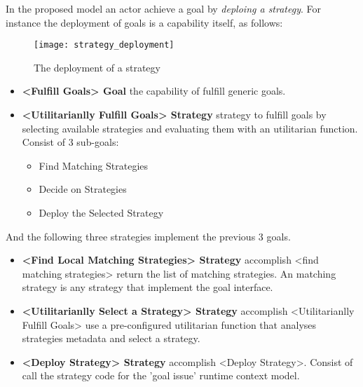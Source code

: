 In the proposed model an actor achieve a goal by \emph{deploing a strategy}. For instance the deployment of goals is a capability itself, as follows:

\begin{figure}
  \centering
  \texttt{[image: strategy\_deployment]}
  \caption{The deployment of a strategy}
  \label{fig:agent_composition}
\end{figure}

\begin{itemize}

\item \textbf{<Fulfill Goals> Goal} the capability of fulfill generic goals.

\item \textbf{<Utilitarianlly Fulfill Goals> Strategy } strategy to fulfill goals by selecting available strategies and evaluating them with an utilitarian function. Consist of 3 sub-goals:
  \begin{itemize}
    \item Find Matching Strategies
    \item Decide on Strategies
    \item Deploy the Selected Strategy
  \end{itemize}
\end{itemize}

And the following three strategies implement the previous 3 goals.

\begin{itemize}
  \item \textbf{<Find Local Matching Strategies> Strategy} accomplish <find matching strategies>
  return the list of matching strategies. An matching strategy is any strategy that implement the goal interface.

  \item \textbf{<Utilitarianlly Select a Strategy> Strategy} accomplish <Utilitarianlly Fulfill Goals>
  use a pre-configured utilitarian function that analyses strategies metadata and select a strategy.

  \item \textbf{<Deploy Strategy> Strategy} accomplish <Deploy Strategy>.
  Consist of call the strategy code for the 'goal issue' runtime context model.
\end{itemize}

%
%
%
%
%
%
%
